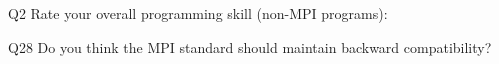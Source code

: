 \begin{description}%
\item{Q2} Rate your overall programming skill (non-MPI programs):%
\item{Q28} Do you think the MPI standard should maintain backward compatibility?%
\end{description}%
